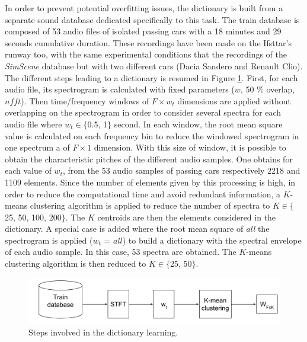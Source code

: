 \documentclass[twocolumn]{svjour3}          %
\begin{document}
In order to prevent potential overfitting issues, the dictionary is built from a separate sound database dedicated specifically to this task. The train database is composed of 53 audio files of isolated passing cars with a 18 minutes and 29 seconds cumulative duration. These recordings have been made on the Ifsttar's runway too, with the same experimental conditions that the recordings of the \textit{SimScene} database but with two different cars (Dacia Sandero and Renault Clio). The different steps leading to a dictionary is resumed in Figure \ref{fig:creation_W}. First, for each audio file, its spectrogram is calculated with fixed parameters ($w$, 50 $\%$ overlap, $nfft$). Then time/frequency windows of $F \times w_t $ dimensions are applied without overlapping on the spectrogram in order to consider several spectra for each audio file where $w_t \in \lbrace$0.5, 1$\rbrace$ second. In each window, the root mean square value is calculated on each frequency bin to reduce the windowed spectrogram in one spectrum a of $F \times 1$ dimension. With this size of window, it is possible to obtain the characteristic pitches of the different audio samples. One obtains for each value of $w_t$, from the 53 audio samples of passing cars respectively 2218 and 1109 elements. Since the number of elements given by this processing is high, in order to reduce the computational time and avoid redundant information, a $K$-means clustering algorithm is applied to reduce the number of spectra to $K \in \lbrace$25, 50, 100, 200$\rbrace$. The $K$ centroids are then the elements considered in the dictionary. A special case is added where the root mean square of \textit{all} the spectrogram is applied ($w_t$ = $all$) to build a dictionary with the spectral envelope of each audio sample. In this case, 53 spectra are obtained. The $K$-means clustering algorithm is then reduced to $K \in \lbrace$25, 50$\rbrace$.

\begin{figure}[t]
\centering
\includegraphics[width=\linewidth]{figures/creation_W_EN.pdf}
\caption{Steps involved in the dictionary learning.}
\label{fig:creation_W}
\end{figure}
\end{document}
